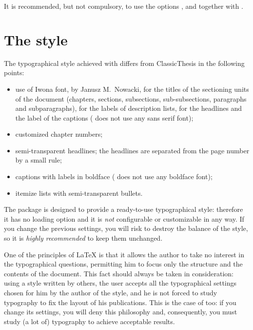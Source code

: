 It is recommended, but not compulsory, to use the options ,  and  together with \arsclassica.






\section{The style}

The typographical style achieved with \arsclassica{} differs from ClassicThesis in the following points:
\begin{itemize}
\item use of Iwona font, by Janusz M.~Nowacki, for the titles of the sectioning units of the document (chapters, sections, subsections, sub-subsections, paragraphs and subparagraphs), for the labels of description lists, for the headlines and the label of the captions (\classicthesis{} does not use any sans serif font);
\item customized chapter numbers;
\item semi-transparent headlines; the headlines are separated from the page number by a small rule;
\item captions with labels in boldface (\classicthesis{} does not use any boldface font);
\item itemize lists with semi-transparent bullets.
\end{itemize}

The \arsclassica{} package is designed  to provide a ready-to-use typographical style: therefore it has no loading option and it is \emph{not} configurable or customizable in any way. If you change the previous settings, you will risk to destroy the balance of the style, so it is \emph{highly recommended} to keep them unchanged.

One of the principles of \LaTeX{} is that it allows the author to take no interest in the typographical questions, permitting him to focus only the structure and the contents of the document. This fact should always be taken in consideration: using a style written by others, the user accepts all the typographical settings chosen for him by the author of the style, and he is not forced to study typography to fix the layout of his publications. This is the case of \arsclassica{} too: if you change its settings, you will deny this philosophy and, consequently, you must study (a lot of) typography to achieve acceptable results. 

